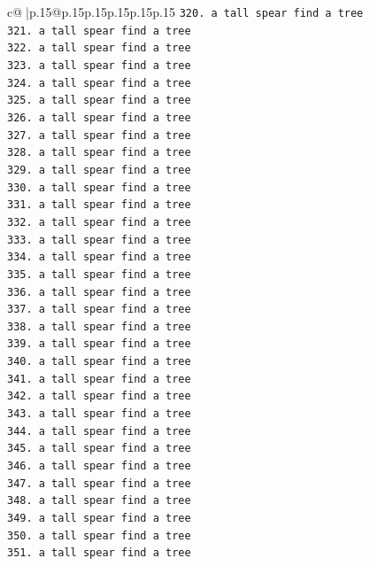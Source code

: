 \documentclass{article}
\begin{document}
{\begin{supertabular}{c@{$\;$}|p{.15\linewidth}@{}p{.15\linewidth}p{.15\linewidth}p{.15\linewidth}p{.15\linewidth}p{.15\linewidth}}
{{{\texttt{320. a tall spear find a tree} \\
\texttt{321. a tall spear find a tree} \\
\texttt{322. a tall spear find a tree} \\
\texttt{323. a tall spear find a tree} \\
\texttt{324. a tall spear find a tree} \\
\texttt{325. a tall spear find a tree} \\
\texttt{326. a tall spear find a tree} \\
\texttt{327. a tall spear find a tree} \\
\texttt{328. a tall spear find a tree} \\
\texttt{329. a tall spear find a tree} \\
\texttt{330. a tall spear find a tree} \\
\texttt{331. a tall spear find a tree} \\
\texttt{332. a tall spear find a tree} \\
\texttt{333. a tall spear find a tree} \\
\texttt{334. a tall spear find a tree} \\
\texttt{335. a tall spear find a tree} \\
\texttt{336. a tall spear find a tree} \\
\texttt{337. a tall spear find a tree} \\
\texttt{338. a tall spear find a tree} \\
\texttt{339. a tall spear find a tree} \\
\texttt{340. a tall spear find a tree} \\
\texttt{341. a tall spear find a tree} \\
\texttt{342. a tall spear find a tree} \\
\texttt{343. a tall spear find a tree} \\
\texttt{344. a tall spear find a tree} \\
\texttt{345. a tall spear find a tree} \\
\texttt{346. a tall spear find a tree} \\
\texttt{347. a tall spear find a tree} \\
\texttt{348. a tall spear find a tree} \\
\texttt{349. a tall spear find a tree} \\
\texttt{350. a tall spear find a tree} \\
\texttt{351. a tall spear find a tree} \\
}}}
\end{supertabular}}
\end{document}
